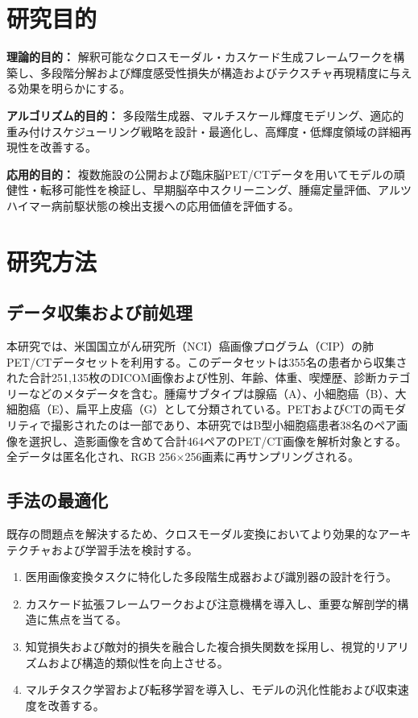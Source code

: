 \documentclass[twocolumn]{article}
\begin{document}
\section{研究目的}
\textbf{理論的目的：} 解釈可能なクロスモーダル・カスケード生成フレームワークを構築し、多段階分解および輝度感受性損失が構造およびテクスチャ再現精度に与える効果を明らかにする。

\textbf{アルゴリズム的目的：} 多段階生成器、マルチスケール輝度モデリング、適応的重み付けスケジューリング戦略を設計・最適化し、高輝度・低輝度領域の詳細再現性を改善する。

\textbf{応用的目的：} 複数施設の公開および臨床脳PET/CTデータを用いてモデルの頑健性・転移可能性を検証し、早期脳卒中スクリーニング、腫瘍定量評価、アルツハイマー病前駆状態の検出支援への応用価値を評価する。

\section{研究方法}
\subsection{データ収集および前処理}
本研究では、米国国立がん研究所（NCI）癌画像プログラム（CIP）の肺PET/CTデータセットを利用する。このデータセットは355名の患者から収集された合計251,135枚のDICOM画像および性別、年齢、体重、喫煙歴、診断カテゴリーなどのメタデータを含む。腫瘍サブタイプは腺癌（A）、小細胞癌（B）、大細胞癌（E）、扁平上皮癌（G）として分類されている。PETおよびCTの両モダリティで撮影されたのは一部であり、本研究ではB型小細胞癌患者38名のペア画像を選択し、造影画像を含めて合計464ペアのPET/CT画像を解析対象とする。全データは匿名化され、RGB 256×256画素に再サンプリングされる。

\subsection{手法の最適化}
既存の問題点を解決するため、クロスモーダル変換においてより効果的なアーキテクチャおよび学習手法を検討する。
\begin{enumerate}
	\item 医用画像変換タスクに特化した多段階生成器および識別器の設計を行う。
	\item カスケード拡張フレームワークおよび注意機構を導入し、重要な解剖学的構造に焦点を当てる。
	\item 知覚損失および敵対的損失を融合した複合損失関数を採用し、視覚的リアリズムおよび構造的類似性を向上させる。
	\item マルチタスク学習および転移学習を導入し、モデルの汎化性能および収束速度を改善する。
\end{enumerate}
\end{document}
